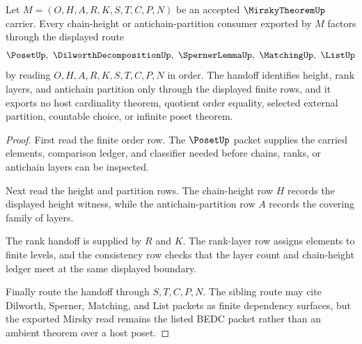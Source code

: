 \begin{theorem}
\label{thm:mirsky-theorem-chain-antichain-rank-handoff}
Let $M=(O,H,A,R,K,S,T,C,P,N)$ be an accepted $\MirskyTheoremUp$ carrier. Every chain-height or antichain-partition consumer exported by $M$ factors through the displayed route
$$
\PosetUp,\ \DilworthDecompositionUp,\ \SpernerLemmaUp,\ \MatchingUp,\ \ListUp
$$
by reading $O,H,A,R,K,S,T,C,P,N$ in order. The handoff identifies height, rank layers, and antichain partition only through the displayed finite rows, and it exports no host cardinality theorem, quotient order equality, selected external partition, countable choice, or infinite poset theorem.
\end{theorem}
\begin{proof}
First read the finite order row. The $\PosetUp$ packet supplies the carried elements, comparison ledger, and classifier needed before chains, ranks, or antichain layers can be inspected.

Next read the height and partition rows. The chain-height row $H$ records the displayed height witness, while the antichain-partition row $A$ records the covering family of layers.

The rank handoff is supplied by $R$ and $K$. The rank-layer row assigns elements to finite levels, and the consistency row checks that the layer count and chain-height ledger meet at the same displayed boundary.

Finally route the handoff through $S,T,C,P,N$. The sibling route may cite Dilworth, Sperner, Matching, and List packets as finite dependency surfaces, but the exported Mirsky read remains the listed BEDC packet rather than an ambient theorem over a host poset.
\end{proof}


\begin{closurestatus}{\MirskyTheoremUp}
  \theoryclosure{\seedClosure}
  \formalstatus{\formalTargetV}
\end{closurestatus}
